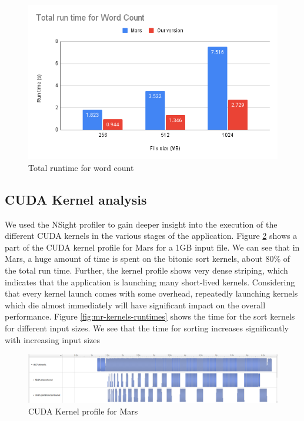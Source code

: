 \documentclass{article}
\begin{document}
\begin{figure}[h]
    \centering
    \includegraphics[width=1\linewidth]{images/mr-runtime.png}
    \caption{Total runtime for word count}
    \label{fig:mr-runtime}
\end{figure}

\subsection{CUDA Kernel analysis}
We used the  NSight profiler to gain deeper insight into the execution of the different CUDA kernels in the various stages of the application. Figure \ref{fig:mr-mars-kernels} shows a part of the CUDA kernel profile for Mars for a 1GB input file. We can see that in Mars, a huge amount of time is spent on the bitonic sort kernels, about 80\% of the total run time. Further, the kernel profile shows very dense striping, which indicates that the application is launching many short-lived kernels. Considering that every kernel launch comes with some overhead, repeatedly launching kernels which die almost immediately will have significant impact on the overall performance.  Figure \ref{fig:mr-kernels-runtimes} shows the time for the sort kernels for different input sizes. We see that the time for sorting increases significantly with increasing input sizes

\begin{figure}[h]
    \centering
    \includegraphics[width=1\linewidth]{images/mr-mars-kernels.png}
    \caption{CUDA Kernel profile for Mars}
    \label{fig:mr-mars-kernels}
\end{figure}
\end{document}
